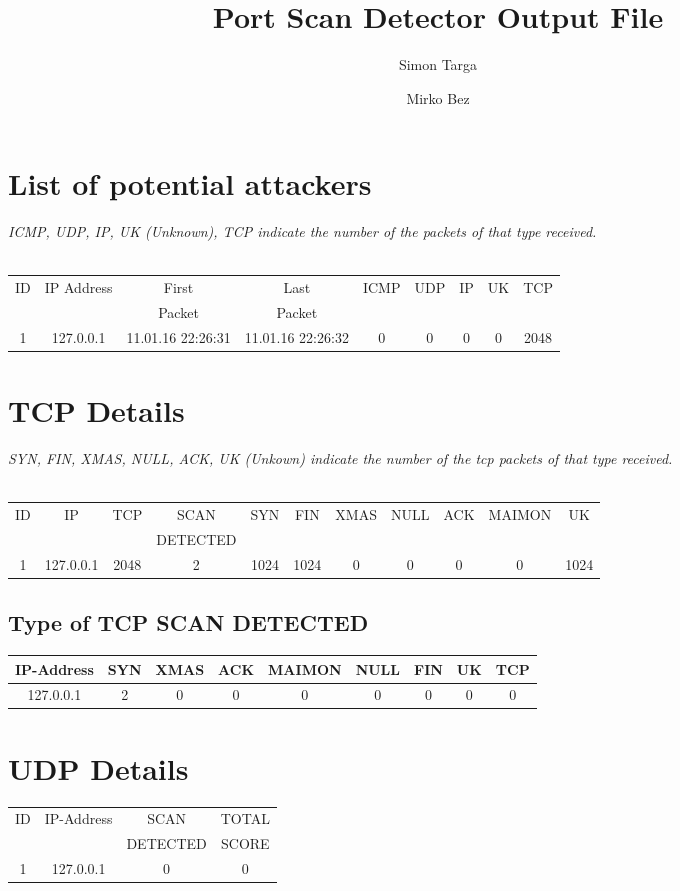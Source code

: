 \documentclass[a4paper]{scrartcl}
\author{Simon Targa \and Mirko Bez}
\title{Port Scan Detector Output File}
\begin{document}
\maketitle{}
\tableofcontents
\newpage
\section{List of potential attackers}
\emph{ICMP, UDP, IP, UK (Unknown), TCP indicate the number of the packets of that type received.} \\ \\ 
\begin{tabular}{| c | c | c | c | c | c | c | c | c | }
\hline
ID & IP Address & First & Last  & ICMP & UDP & IP & UK & TCP \\ 
   &            & Packet & Packet &     &    &    &     & \\ 
\hline
1 & 127.0.0.1 & 11.01.16 22:26:31 & 11.01.16 22:26:32 &   0 &   0 &   0 &   0 & 2048 \\ 
\hline
\end{tabular}
\section{TCP Details}
\emph{SYN, FIN, XMAS, NULL, ACK, UK (Unkown) indicate the number of the tcp packets of that type received.} \\ \\ 
\begin{tabular}{| c | c | c | c | c | c | c | c | c | c | c | }
\hline 
ID & IP & TCP & SCAN & SYN  & FIN & XMAS & NULL & ACK & MAIMON & UK \\ 
 &  & & DETECTED &   &  &  &  &  & &  \\ 
\hline 
1 & 127.0.0.1 & 2048 &   2 & 1024 & 1024 &   0 &   0 &   0 &   0 & 1024\\ \hline
\end{tabular}
\subsection{Type of TCP SCAN DETECTED}
\begin{tabular}{| c | c | c | c | c | c | c | c | c | }
\hline 
IP-Address &  SYN & XMAS & ACK & MAIMON & NULL & FIN & UK & TCP \\ 
\hline 
127.0.0.1& 2 & 0 & 0 & 0 & 0 & 0 & 0 & 0  \\ 
 \hline
\end{tabular}
\section{UDP Details}
\begin{tabular}{| c | c | c | c |}
\hline 
ID & IP-Address & SCAN     & TOTAL \\ 
   &            & DETECTED & SCORE \\ 
\hline
1 & 127.0.0.1 & 0 & 0 \\ \hline 
\end{tabular}
\end{document}
